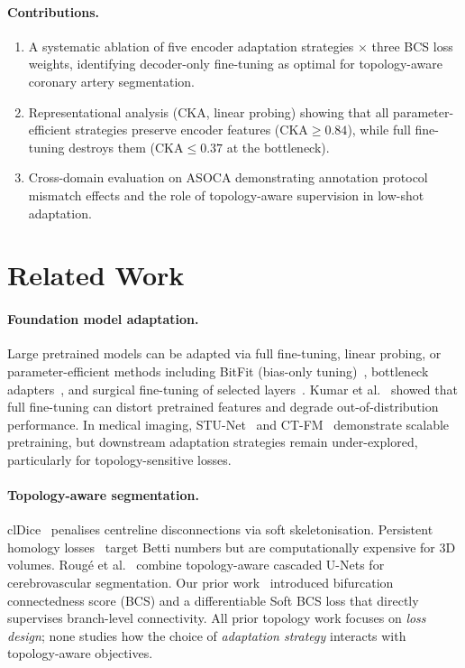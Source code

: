 \documentclass[runningheads]{llncs}
\begin{document}
\paragraph{Contributions.}
\begin{enumerate}
    \item A systematic ablation of five encoder adaptation strategies $\times$ three BCS loss weights, identifying decoder-only fine-tuning as optimal for topology-aware coronary artery segmentation.
    \item Representational analysis (CKA, linear probing) showing that all parameter-efficient strategies preserve encoder features (CKA${\geq}0.84$), while full fine-tuning destroys them (CKA${\leq}0.37$ at the bottleneck).
    \item Cross-domain evaluation on ASOCA demonstrating annotation protocol mismatch effects and the role of topology-aware supervision in low-shot adaptation.
\end{enumerate}

\section{Related Work}

\paragraph{Foundation model adaptation.}
Large pretrained models can be adapted via full fine-tuning, linear probing, or parameter-efficient methods including BitFit (bias-only tuning)~\cite{zaken_bitfit_2022}, bottleneck adapters~\cite{houlsby_adapters_2019,chen_adaptformer_2022}, and surgical fine-tuning of selected layers~\cite{lee_surgical_2023}.
Kumar et al.~\cite{kumar_finetuning_2022} showed that full fine-tuning can distort pretrained features and degrade out-of-distribution performance.
In medical imaging, STU-Net~\cite{huang_stu_2023} and CT-FM~\cite{pai_ctfm_2025} demonstrate scalable pretraining, but downstream adaptation strategies remain under-explored, particularly for topology-sensitive losses.

\paragraph{Topology-aware segmentation.}
clDice~\cite{shit_cldice_2021} penalises centreline disconnections via soft skeletonisation.
Persistent homology losses~\cite{clough_topological_2022,hu_topology_2019} target Betti numbers but are computationally expensive for 3D volumes.
Roug\'e et al.~\cite{rouge_topology_2024} combine topology-aware cascaded U-Nets for cerebrovascular segmentation.
Our prior work~\cite{anonymous_bcs_2026} introduced bifurcation connectedness score (BCS) and a differentiable Soft BCS loss that directly supervises branch-level connectivity.
All prior topology work focuses on \emph{loss design}; none studies how the choice of \emph{adaptation strategy} interacts with topology-aware objectives.
\end{document}
